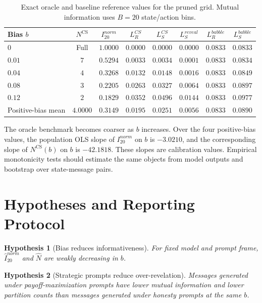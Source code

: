 \documentclass[11pt]{article}
\newtheorem{hypothesis}{Hypothesis}
\newcommand{\NCS}{N^{\mathrm{CS}}}
\begin{document}
\begin{table}[H]
\centering
\small
\caption{Exact oracle and baseline reference values for the pruned grid.  Mutual information uses $B=20$ state/action bins.}
\label{tab:oracle-main}
\begin{tabular}{lccccccc}
\toprule
Bias $b$ & $\NCS$ & $I^{norm}_{20}$ & $L_R^{CS}$ & $L_S^{CS}$ & $L_S^{reveal}$ & $L_R^{babble}$ & $L_S^{babble}$ \\
\midrule
$0$ & Full & $1.0000$ & $0.0000$ & $0.0000$ & $0.0000$ & $0.0833$ & $0.0833$ \\
$0.01$ & $7$ & $0.5294$ & $0.0033$ & $0.0034$ & $0.0001$ & $0.0833$ & $0.0834$ \\
$0.04$ & $4$ & $0.3268$ & $0.0132$ & $0.0148$ & $0.0016$ & $0.0833$ & $0.0849$ \\
$0.08$ & $3$ & $0.2205$ & $0.0263$ & $0.0327$ & $0.0064$ & $0.0833$ & $0.0897$ \\
$0.12$ & $2$ & $0.1829$ & $0.0352$ & $0.0496$ & $0.0144$ & $0.0833$ & $0.0977$ \\
\midrule
Positive-bias mean & $4.0000$ & $0.3149$ & $0.0195$ & $0.0251$ & $0.0056$ & $0.0833$ & $0.0890$ \\
\bottomrule
\end{tabular}
\end{table}

The oracle benchmark becomes coarser as $b$ increases.  Over the four positive-bias values, the population OLS slope of $I^{norm}_{20}$ on $b$ is $-3.0210$, and the corresponding slope of $\NCS(b)$ on $b$ is $-42.1818$.  These slopes are calibration values.  Empirical monotonicity tests should estimate the same objects from model outputs and bootstrap over state-message pairs.

\section{Hypotheses and Reporting Protocol}\label{sec:hypotheses}

\begin{hypothesis}[Bias reduces informativeness]\label{hyp:bias}
For fixed model and prompt frame, $\widehat I^{norm}_{20}$ and $\widehat N$ are weakly decreasing in $b$.
\end{hypothesis}

\begin{hypothesis}[Strategic prompts reduce over-revelation]\label{hyp:prompt}
Messages generated under payoff-maximization prompts have lower mutual information and lower partition counts than messages generated under honesty prompts at the same $b$.
\end{hypothesis}
\end{document}
